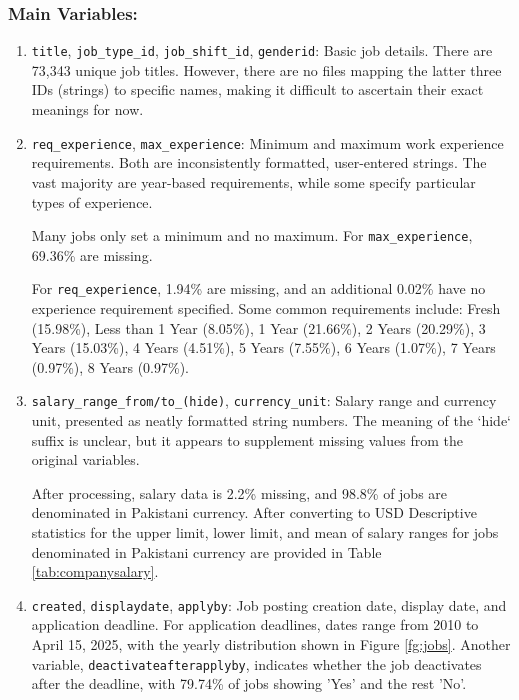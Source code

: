 \documentclass[12pt]{article}
\begin{document}
\subsubsection*{\textbf{Main Variables}:}
    \begin{enumerate}
        \item \texttt{title}, \texttt{job\_type\_id}, \texttt{job\_shift\_id}, \texttt{genderid}: Basic job details. There are 73,343 unique job titles. However, there are no files mapping the latter three IDs (strings) to specific names, making it difficult to ascertain their exact meanings for now.
        \item \texttt{req\_experience}, \texttt{max\_experience}: Minimum and maximum work experience requirements. Both are inconsistently formatted, user-entered strings. The vast majority are year-based requirements, while some specify particular types of experience. 
        
        Many jobs only set a minimum and no maximum. For \texttt{max\_experience}, 69.36\% are missing.
        
        For \texttt{req\_experience}, 1.94\% are missing, and an additional 0.02\% have no experience requirement specified. Some common requirements include: Fresh (15.98\%), Less than 1 Year (8.05\%), 1 Year (21.66\%), 2 Years (20.29\%), 3 Years (15.03\%), 4 Years (4.51\%), 5 Years (7.55\%), 6 Years (1.07\%), 7 Years (0.97\%), 8 Years (0.97\%).
        \item \texttt{salary\_range\_from/to\_(hide)}, \texttt{currency\_unit}: Salary range and currency unit, presented as neatly formatted string numbers. The meaning of the `hide` suffix is unclear, but it appears to supplement missing values from the original variables. 
        
        After processing, salary data is 2.2\% missing, and 98.8\% of jobs are denominated in Pakistani currency. After converting to USD Descriptive statistics for the upper limit, lower limit, and mean of salary ranges for jobs denominated in Pakistani currency are provided in Table \ref{tab:companysalary}.

        

        
        \item \texttt{created}, \texttt{displaydate}, \texttt{applyby}: Job posting creation date, display date, and application deadline. For application deadlines, dates range from 2010 to April 15, 2025, with the yearly distribution shown in Figure \ref{fg:jobs}. Another variable, \texttt{deactivateafterapplyby}, indicates whether the job deactivates after the deadline, with 79.74\% of jobs showing 'Yes' and the rest 'No'.


\end{enumerate}
\end{document}
